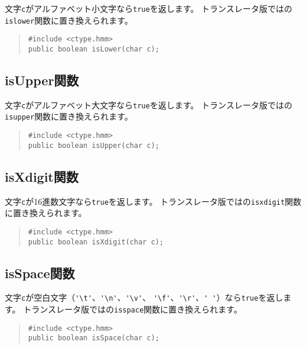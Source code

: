 文字\verb/c/がアルファベット小文字なら\verb/true/を返します。
トランスレータ版では\cl の\verb/islower/関数に置き換えられます。

\begin{quote}
\begin{verbatim}
#include <ctype.hmm>
public boolean isLower(char c);
\end{verbatim}
\end{quote}

\subsection{isUpper関数}

文字\verb/c/がアルファベット大文字なら\verb/true/を返します。
トランスレータ版では\cl の\verb/isupper/関数に置き換えられます。

\begin{quote}
\begin{verbatim}
#include <ctype.hmm>
public boolean isUpper(char c);
\end{verbatim}
\end{quote}

\subsection{isXdigit関数}

文字\verb/c/が16進数文字なら\verb/true/を返します。
トランスレータ版では\cl の\verb/isxdigit/関数に置き換えられます。

\begin{quote}
\begin{verbatim}
#include <ctype.hmm>
public boolean isXdigit(char c);
\end{verbatim}
\end{quote}

\subsection{isSpace関数}

文字\verb/c/が空白文字（\verb/'\t'/、\verb/'\n'/、\verb/'\v'/、
\verb/'\f'/、\verb/'\r'/、\verb/' '/）なら\verb/true/を返します。
トランスレータ版では\cl の\verb/isspace/関数に置き換えられます。

\begin{quote}
\begin{verbatim}
#include <ctype.hmm>
public boolean isSpace(char c);
\end{verbatim}
\end{quote}


